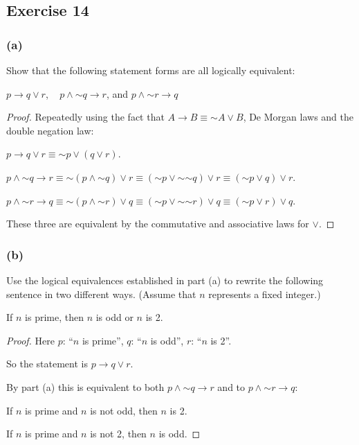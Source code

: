 \documentclass[14pt]{extarticle}
\begin{document}
\subsection{Exercise 14}
\subsubsection{(a)}
Show that the following statement forms are all logically equivalent:

$p \to q \vee r$, \,\,\, $p \wedge {\sim q} \to r$, and $p \wedge {\sim r} \to q$

\begin{proof}
    Repeatedly using the fact that $A \to B \equiv {\sim A} \vee B$, De Morgan laws and the double negation law:

    $p \to q \vee r \equiv {\sim p} \vee (q \vee r)$.

    $p \wedge {\sim q} \to r \equiv {\sim (p \wedge {\sim q}) \vee r} \equiv ({\sim p} \vee {\sim {\sim q}}) \vee r \equiv ({\sim p} \vee q) \vee r$.

    $p \wedge {\sim r} \to q \equiv {\sim (p \wedge {\sim r}) \vee q} \equiv ({\sim p} \vee {\sim {\sim r}}) \vee q \equiv ({\sim p} \vee r) \vee q$.

    These three are equivalent by the commutative and associative laws for $\vee$.
\end{proof}

\subsubsection{(b)}
Use the logical equivalences established in part (a) to rewrite the following sentence in two different ways. (Assume that $n$
represents a fixed integer.)

\begin{center}
    If $n$ is prime, then $n$ is odd or $n$ is 2.
\end{center}

\begin{proof}
    Here $p$: ``$n$ is prime'', $q$: ``$n$ is odd'', $r$: ``$n$ is
    2''.

    So the statement is $p \to q \vee r$.

    By part (a) this is equivalent to both $p \wedge {\sim q} \to r$ and to $p \wedge {\sim r} \to q$:

    If $n$ is prime and $n$ is not odd, then $n$ is 2.

    If $n$ is prime and $n$ is not 2, then $n$ is odd.
\end{proof}
\end{document}

